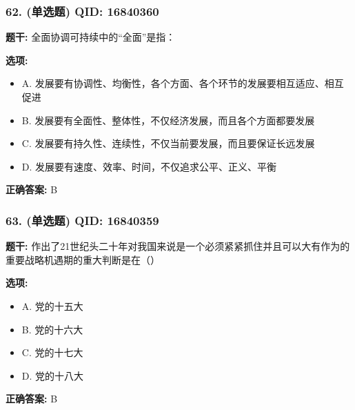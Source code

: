 \documentclass[12pt,UTF8]{ctexart}
\begin{document}
\vspace{0.3em}\hrulefill\vspace{0.7em}

\subsubsection*{62. (单选题) \small QID: 16840360}

\textbf{题干:}
全面协调可持续中的“全面”是指：

\textbf{选项:}
\begin{itemize}[leftmargin=*]

  \item A. 发展要有协调性、均衡性，各个方面、各个环节的发展要相互适应、相互促进

  \item B. 发展要有全面性、整体性，不仅经济发展，而且各个方面都要发展

  \item C. 发展要有持久性、连续性，不仅当前要发展，而且要保证长远发展

  \item D. 发展要有速度、效率、时间，不仅追求公平、正义、平衡

\end{itemize}

\textbf{正确答案:}
B

\vspace{0.3em}\hrulefill\vspace{0.7em}

\subsubsection*{63. (单选题) \small QID: 16840359}

\textbf{题干:}
作出了21世纪头二十年对我国来说是一个必须紧紧抓住并且可以大有作为的重要战略机遇期的重大判断是在（）

\textbf{选项:}
\begin{itemize}[leftmargin=*]

  \item A. 党的十五大

  \item B. 党的十六大

  \item C. 党的十七大

  \item D. 党的十八大

\end{itemize}

\textbf{正确答案:}
B
\end{document}
